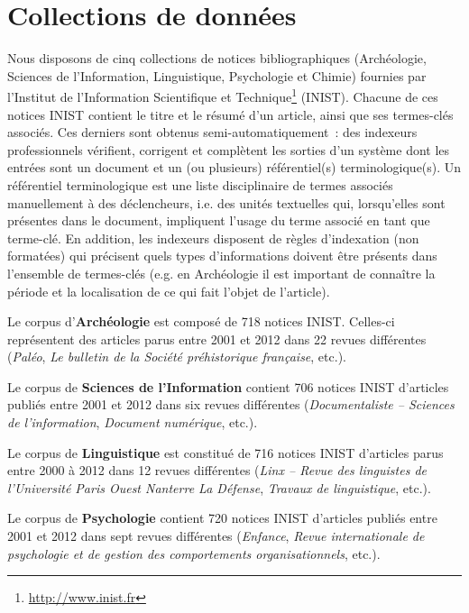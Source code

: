 \section{Collections de données}
\label{sec:presentation_des_donnees}
  Nous disposons de cinq collections de notices bibliographiques (Archéologie,
  Sciences de l'Information, Linguistique, Psychologie et Chimie) fournies par
  l'Institut de l’Information Scientifique et
  Technique\footnote{\url{http://www.inist.fr}} (INIST). Chacune de ces notices
  INIST contient le titre et le résumé d'un article, ainsi que ses termes-clés
  associés. Ces derniers sont obtenus semi-automatiquement~: des indexeurs
  professionnels vérifient, corrigent et complètent les sorties d'un système
  dont les entrées sont un document et un (ou plusieurs) référentiel(s)
  terminologique(s). Un référentiel terminologique est une liste disciplinaire
  de termes associés manuellement à des déclencheurs, i.e. des unités textuelles
  qui, lorsqu'elles sont présentes dans le document, impliquent l'usage du terme
  associé en tant que terme-clé. En addition, les indexeurs disposent de règles
  d'indexation (non formatées) qui précisent quels types d'informations doivent
  être présents dans l'ensemble de termes-clés (e.g. en Archéologie il est
  important de connaître la période et la localisation de ce qui fait l'objet de
  l'article).

  Le corpus d'\textbf{Archéologie} est composé de 718 notices INIST. Celles-ci
  représentent des articles parus entre 2001 et 2012 dans 22 revues différentes
  (\textit{Paléo}, \textit{Le bulletin de la Société préhistorique française},
  etc.).

  Le corpus de \textbf{Sciences de l'Information} contient 706 notices INIST
  d'articles publiés entre 2001 et 2012 dans six revues différentes
  (\textit{Documentaliste -- Sciences de l'information}, \textit{Document
  numérique}, etc.).

  Le corpus de \textbf{Linguistique} est constitué de 716 notices INIST
  d'articles parus entre 2000 à 2012 dans 12 revues différentes
  (\textit{Linx -- Revue des linguistes de l'Université Paris Ouest Nanterre La
  Défense}, \textit{Travaux de linguistique}, etc.).

  Le corpus de \textbf{Psychologie} contient 720 notices INIST d'articles
  publiés entre 2001 et 2012 dans sept revues différentes
  (\textit{Enfance}, \textit{Revue internationale de psychologie et de gestion
  des comportements organisationnels}, etc.).

